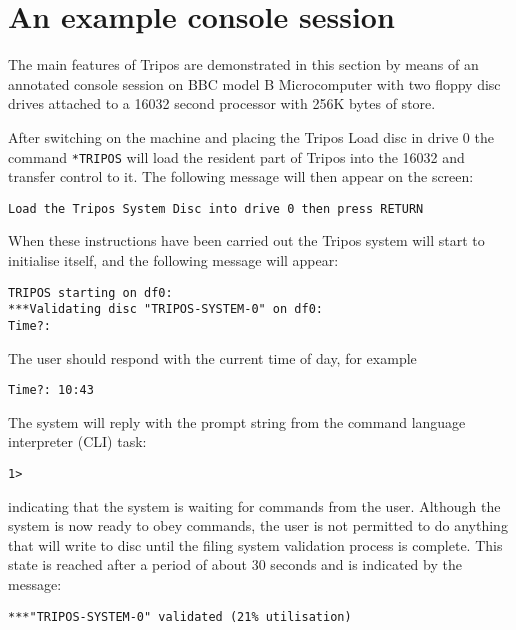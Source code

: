 \section{An example console session}

The main features of Tripos are demonstrated in this section by means
of an annotated console session on BBC model B Microcomputer with two
floppy disc drives attached to a 16032 second processor with 256K
bytes of store.

After switching on the machine and placing the Tripos Load disc in
drive 0 the command \verb|*TRIPOS| will load the resident part of
Tripos into the 16032 and transfer control to it.  The following
message will then appear on the screen:
\begin{verbatim}
Load the Tripos System Disc into drive 0 then press RETURN
\end{verbatim}
\noindent
When these instructions have been carried out the Tripos system will
start to initialise itself, and the following message will appear:
\begin{verbatim}
TRIPOS starting on df0:
***Validating disc "TRIPOS-SYSTEM-0" on df0:
Time?: 
\end{verbatim}
\noindent
The user should respond with the current time of day, for example
\begin{verbatim}
Time?: 10:43
\end{verbatim}
\noindent
The system will reply with the prompt string from the command language
interpreter (CLI) task:
\begin{verbatim}
1>
\end{verbatim}
\noindent
indicating that the system is waiting for commands from the user.
Although the system is now ready to obey commands, the user is not
permitted to do anything that will write to disc until the filing
system validation process is complete.  This state is reached after a
period of about 30 seconds and is indicated by the message:
\begin{verbatim}
***"TRIPOS-SYSTEM-0" validated (21% utilisation)
\end{verbatim}

